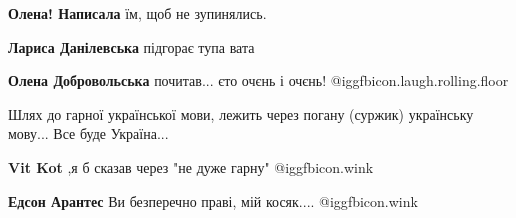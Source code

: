 \begin{itemize}
 
\textbf{Олена! Написала} їм, щоб не зупинялись.

 
\textbf{Лариса Данілевська} підгорає тупа вата

 
\textbf{Олена Добровольська} почитав... єто очєнь і очєнь! @igg{fbicon.laugh.rolling.floor} 
\end{itemize}

 
Шлях до гарної української мови, лежить через погану (суржик) українську
мову... Все буде Україна...

\begin{itemize}
 
\textbf{Vit Kot} ,я б сказав через "не дуже гарну"  @igg{fbicon.wink} 

 
\textbf{Едсон Арантес} Ви безперечно праві, мій косяк....  @igg{fbicon.wink} 

\end{itemize}

